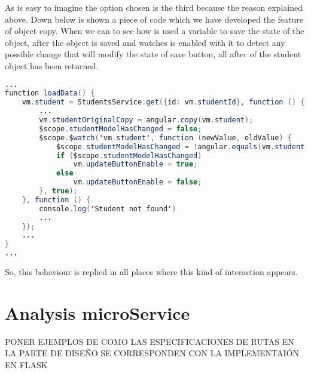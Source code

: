 \noindent As is easy to imagine the option chosen is the third because the reason explained
above. Down below is shown a piece of code which we have developed the feature of object copy.
When we can to see how is used a variable to save the state of the object, after
the object is saved and watches is enabled with it to detect any possible change
that will modify the state of save button, all after of the student object has been returned.

\begin{lstlisting}[language=java,frame=none, title=studentProfile.js]
...
function loadData() {
    vm.student = StudentsService.get({id: vm.studentId}, function () {
        ...
        vm.studentOriginalCopy = angular.copy(vm.student);
        $scope.studentModelHasChanged = false;
        $scope.$watch('vm.student', function (newValue, oldValue) {
            $scope.studentModelHasChanged = !angular.equals(vm.student, vm.studentOriginalCopy);
            if ($scope.studentModelHasChanged)
                vm.updateButtonEnable = true;
            else
                vm.updateButtonEnable = false;
        }, true);
    }, function () {
        console.log('Student not found')
        ...
    });
    ...
}
...
\end{lstlisting}

\noindent So, this behaviour is replied in all places where this kind of interaction appears.

\section{Analysis microService}




PONER EJEMPLOS DE COMO LAS ESPECIFICACIONES DE RUTAS EN LA PARTE DE DISEÑO
SE CORRESPONDEN CON LA IMPLEMENTAIÓN EN FLASK
